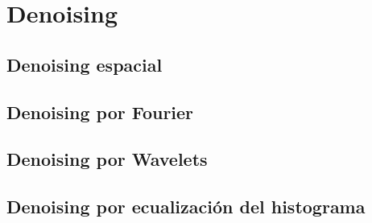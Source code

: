 \section{Denoising} \label{sec:denoising}

\subsection{Denoising espacial} \label{subsec:denoising_esp}

\subsection{Denoising por Fourier} \label{subsec:denoising_fourier}

\subsection{Denoising por Wavelets} \label{subsec:denoising_wav}

\subsection{Denoising por ecualización del histograma} \label{subsec:clahe}
